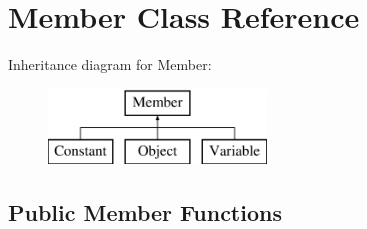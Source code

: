 \hypertarget{classMember}{\section{Member Class Reference}
\label{classMember}
}
Inheritance diagram for Member\+:\begin{figure}[H]
\begin{center}
\leavevmode
\includegraphics[height=2.000000cm]{classMember}
\end{center}
\end{figure}
\subsection*{Public Member Functions}
